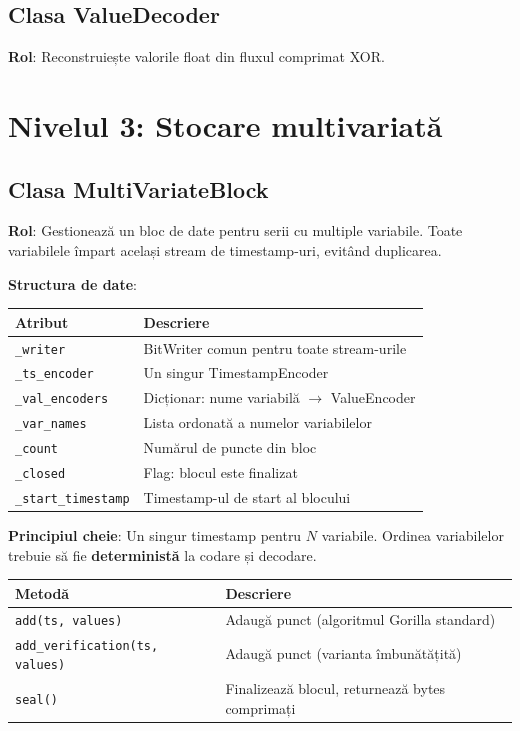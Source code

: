 \subsection{Clasa ValueDecoder}

\textbf{Rol}: Reconstruiește valorile float din fluxul comprimat XOR.

\section{Nivelul 3: Stocare multivariată}

\subsection{Clasa MultiVariateBlock}

\textbf{Rol}: Gestionează un bloc de date pentru serii cu multiple variabile. Toate variabilele împart același stream de timestamp-uri, evitând duplicarea.

\textbf{Structura de date}:
\begin{center}
\begin{tabular}{|l|p{8cm}|}
\hline
\textbf{Atribut} & \textbf{Descriere} \\
\hline
\texttt{\_writer} & BitWriter comun pentru toate stream-urile \\
\texttt{\_ts\_encoder} & Un singur TimestampEncoder \\
\texttt{\_val\_encoders} & Dicționar: nume variabilă $\rightarrow$ ValueEncoder \\
\texttt{\_var\_names} & Lista ordonată a numelor variabilelor \\
\texttt{\_count} & Numărul de puncte din bloc \\
\texttt{\_closed} & Flag: blocul este finalizat \\
\texttt{\_start\_timestamp} & Timestamp-ul de start al blocului \\
\hline
\end{tabular}
\end{center}

\textbf{Principiul cheie}: Un singur timestamp pentru $N$ variabile. Ordinea variabilelor trebuie să fie \textbf{deterministă} la codare și decodare.

\begin{center}
\begin{tabular}{|l|p{8cm}|}
\hline
\textbf{Metodă} & \textbf{Descriere} \\
\hline
\texttt{add(ts, values)} & Adaugă punct (algoritmul Gorilla standard) \\
\texttt{add\_verification(ts, values)} & Adaugă punct (varianta îmbunătățită) \\
\texttt{seal()} & Finalizează blocul, returnează bytes comprimați \\
\hline
\end{tabular}
\end{center}

